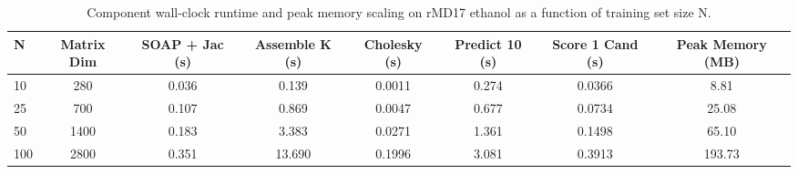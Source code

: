 \begin{table}[htbp]
\centering
\caption{Component wall-clock runtime and peak memory scaling on rMD17 ethanol as a function of training set size N.}
\label{tab:computational_scaling}
\begin{tabular}{lccccccc}
\toprule
N & Matrix Dim & SOAP + Jac (s) & Assemble K (s) & Cholesky (s) & Predict 10 (s) & Score 1 Cand (s) & Peak Memory (MB) \\
\midrule
10 & 280 & 0.036 & 0.139 & 0.0011 & 0.274 & 0.0366 & 8.81 \\
25 & 700 & 0.107 & 0.869 & 0.0047 & 0.677 & 0.0734 & 25.08 \\
50 & 1400 & 0.183 & 3.383 & 0.0271 & 1.361 & 0.1498 & 65.10 \\
100 & 2800 & 0.351 & 13.690 & 0.1996 & 3.081 & 0.3913 & 193.73 \\
\bottomrule
\end{tabular}
\end{table}
